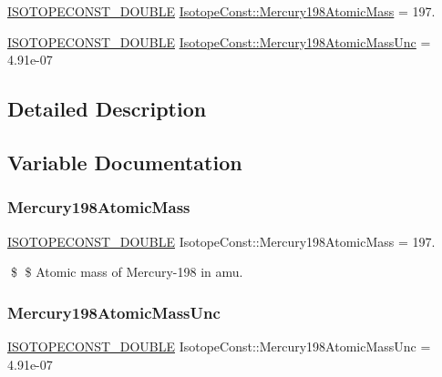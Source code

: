 \begin{DoxyCompactItemize}
\item 
\mbox{\hyperlink{group___isotope_const-_macros_ga8f45a7272ce02c0b4c65c44636ed719a}{I\+S\+O\+T\+O\+P\+E\+C\+O\+N\+S\+T\+\_\+\+D\+O\+U\+B\+LE}} \mbox{\hyperlink{group___isotope_const-_mercury-_hg198_ga0f37874d95e489f28be9db77763eb1b2}{Isotope\+Const\+::\+Mercury198\+Atomic\+Mass}} = 197.
\item 
\mbox{\hyperlink{group___isotope_const-_macros_ga8f45a7272ce02c0b4c65c44636ed719a}{I\+S\+O\+T\+O\+P\+E\+C\+O\+N\+S\+T\+\_\+\+D\+O\+U\+B\+LE}} \mbox{\hyperlink{group___isotope_const-_mercury-_hg198_ga9c258c39af03286edc2dcd92d3e386ef}{Isotope\+Const\+::\+Mercury198\+Atomic\+Mass\+Unc}} = 4.\+91e-\/07
\end{DoxyCompactItemize}


\subsection{Detailed Description}


\subsection{Variable Documentation}
\mbox{\label{group___isotope_const-_mercury-_hg198_ga0f37874d95e489f28be9db77763eb1b2}} 
\subsubsection{\texorpdfstring{Mercury198\+Atomic\+Mass}{Mercury198AtomicMass}}
{\footnotesize\ttfamily \mbox{\hyperlink{group___isotope_const-_macros_ga8f45a7272ce02c0b4c65c44636ed719a}{I\+S\+O\+T\+O\+P\+E\+C\+O\+N\+S\+T\+\_\+\+D\+O\+U\+B\+LE}} Isotope\+Const\+::\+Mercury198\+Atomic\+Mass = 197.}

\$ \$ Atomic mass of Mercury-\/198 in amu. \mbox{\label{group___isotope_const-_mercury-_hg198_ga9c258c39af03286edc2dcd92d3e386ef}} 
\subsubsection{\texorpdfstring{Mercury198\+Atomic\+Mass\+Unc}{Mercury198AtomicMassUnc}}
{\footnotesize\ttfamily \mbox{\hyperlink{group___isotope_const-_macros_ga8f45a7272ce02c0b4c65c44636ed719a}{I\+S\+O\+T\+O\+P\+E\+C\+O\+N\+S\+T\+\_\+\+D\+O\+U\+B\+LE}} Isotope\+Const\+::\+Mercury198\+Atomic\+Mass\+Unc = 4.\+91e-\/07}

